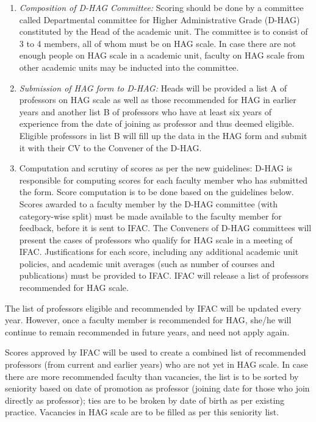 \documentclass[
  10pt,
  a5paper,
  10pt,
  openany]{amsbook}
\begin{document}
\begin{enumerate}
\def\labelenumi{\arabic{enumi}.}
\item
  \emph{Composition of D-HAG Committee:} Scoring should be done by a
  committee called Departmental committee for Higher Administrative
  Grade (D-HAG) constituted by the Head of the academic unit. The
  committee is to consist of 3 to 4 members, all of whom must be on HAG
  scale. In case there are not enough people on HAG scale in a academic
  unit, faculty on HAG scale from other academic units may be inducted
  into the committee.
\item
  \emph{Submission of HAG form to D-HAG:} Heads will be provided a list
  A of professors on HAG scale as well as those recommended for HAG in
  earlier years and another list B of professors who have at least six
  years of experience from the date of joining as professor and thus
  deemed eligible. Eligible professors in list B will fill up the data
  in the HAG form and submit it with their CV to the Convener of the
  D-HAG.
\item
  Computation and scrutiny of scores as per the new guidelines: D-HAG is
  responsible for computing scores for each faculty member who has
  submitted the form. Score computation is to be done based on the
  guidelines below. Scores awarded to a faculty member by the D-HAG
  committee (with category-wise split) must be made available to the
  faculty member for feedback, before it is sent to IFAC. The Conveners
  of D-HAG committees will present the cases of professors who qualify
  for HAG scale in a meeting of IFAC. Justifications for each score,
  including any additional academic unit policies, and academic unit
  averages (such as number of courses and publications) must be provided
  to IFAC. IFAC will release a list of professors recommended for HAG
  scale.
\end{enumerate}

The list of professors eligible and recommended by IFAC will be updated
every year. However, once a faculty member is recommended for HAG,
she/he will continue to remain recommended in future years, and need not
apply again.

Scores approved by IFAC will be used to create a combined list of
recommended professors (from current and earlier years) who are not yet
in HAG scale. In case there are more recommended faculty than vacancies,
the list is to be sorted by seniority based on date of promotion as
professor (joining date for those who join directly as professor); ties
are to be broken by date of birth as per existing practice. Vacancies in
HAG scale are to be filled as per this seniority list.
\end{document}

